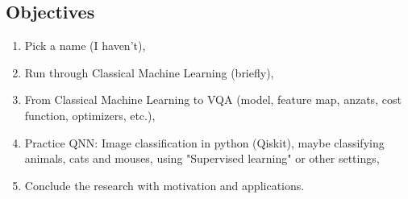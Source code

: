 \subsection{Objectives}
\begin{enumerate}
    \item Pick a name (I haven't),
    \item Run through Classical Machine Learning (briefly),
    \item From Classical Machine Learning to VQA (model, feature map, anzats, cost function, optimizers, etc.),
    \item Practice QNN: Image classification in python (Qiskit), maybe classifying animals, cats and mouses, using "Supervised learning" or other settings,
    \item Conclude the research with motivation and applications.
\end{enumerate}

